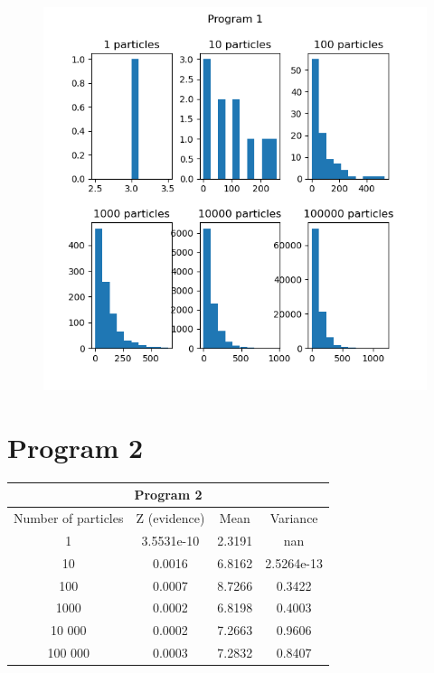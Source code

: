 \documentclass[12pt]{article}%
\theoremstyle{definition}
\begin{document}
	\begin{figure}[h]
	\centering
	\includegraphics[scale=0.6]{program1_hist}
	\end{figure}
		
		
		\newpage
		
		
		\section{Program 2}
	
	
		\begin{center}
			 \begin{tabular}{||c || c c c ||} 
			 \hline
			\multicolumn{4}{|c|}{Program 2} \\
			 \hline
			 Number of particles & Z (evidence) & Mean & Variance \\ [0.5ex] 
			 \hline\hline
			 1 & 3.5531e-10 & 2.3191 & nan  \\ 
			 \hline
			 10 & 0.0016 & 6.8162 & 2.5264e-13  \\
			 \hline
			 100 & 0.0007 & 8.7266 & 0.3422 \\
			 \hline
			 1000 & 0.0002 & 6.8198 & 0.4003  \\  
			 \hline
			 10 000 & 0.0002 & 7.2663 & 0.9606  \\ [1ex]
			 \hline
			 100 000 & 0.0003 & 7.2832 & 0.8407  \\ [1ex]
			 \hline
			\end{tabular}
		\end{center}
		
\end{document}
